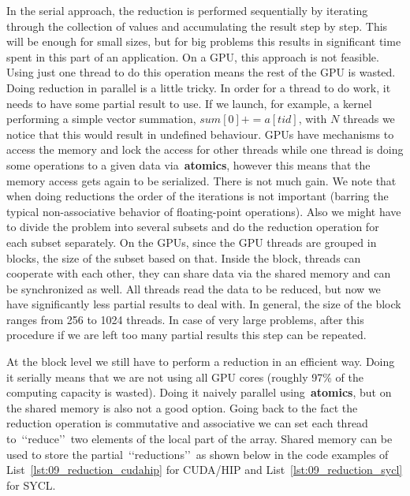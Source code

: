 \par
In the serial approach, the reduction is performed sequentially by iterating through the collection of values and accumulating the result step by step.
This will be enough for small sizes, but for big problems this results in significant time spent in this part of an application.
On a GPU, this approach is not feasible. Using just one thread to do this operation means the rest of the GPU is wasted.
Doing reduction in parallel is a little tricky.
In order for a thread to do work, it needs to have some partial result to use.
If we launch, for example, a kernel performing a simple vector summation, $sum[0] += a[tid]$, with $N$ threads we notice that this would result in undefined behaviour.
GPUs have mechanisms to access the memory and lock the access for other threads while one thread is doing some operations to a given data via~\textbf{atomics}, however this means that the memory access gets again to be serialized.
There is not much gain.
We note that when doing reductions the order of the iterations is not important (barring the typical non-associative behavior of floating-point operations).
Also we might have to divide the problem into several subsets and do the reduction operation for each subset separately.
On the GPUs, since the GPU threads are grouped in blocks, the size of the subset based on that.
Inside the block, threads can cooperate with each other, they can share data via the shared memory and can be synchronized as well.
All threads read the data to be reduced, but now we have significantly less partial results to deal with.
In general, the size of the block ranges from 256 to 1024 threads.
In case of very large problems, after this procedure if we are left too many partial results this step can be repeated.


\par
At the block level we still have to perform a reduction in an efficient way.
Doing it serially means that we are not using all GPU cores (roughly 97\% of the computing capacity is wasted). 
Doing it naively parallel using~\textbf{atomics}, but on the shared memory is also not a good option.
Going back to the fact the reduction operation is commutative and associative we can set each thread to~\lq\lq reduce\rq\rq~two elements of the local part of the array.
Shared memory can be used to store the partial~\lq\lq reductions\rq\rq~as shown below in the code examples of List~\ref{lst:09_reduction_cudahip} for CUDA/HIP and List~\ref{lst:09_reduction_sycl} for SYCL.




